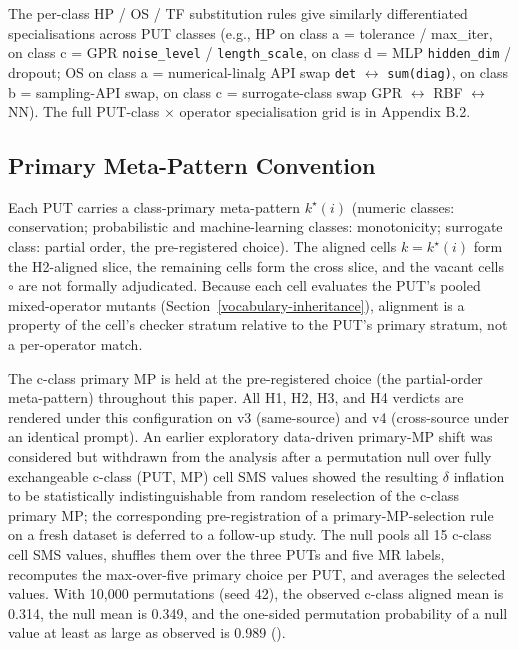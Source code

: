 \documentclass[manuscript,screen,review]{acmart}
\begin{document}
The per-class HP / OS / TF substitution rules give similarly
differentiated specialisations across PUT classes (e.g., HP on class a =
tolerance / max\_iter, on class c = GPR \texttt{noise\_level} /
\texttt{length\_scale}, on class d = MLP \texttt{hidden\_dim} / dropout;
OS on class a = numerical-linalg API swap \texttt{det} $\leftrightarrow$
\texttt{sum(diag)}, on class b = sampling-API swap, on class c =
surrogate-class swap GPR $\leftrightarrow$ RBF $\leftrightarrow$ NN). The full PUT-class $\times$ operator
specialisation grid is in Appendix B.2.

\subsection{Primary Meta-Pattern Convention}\label{primary-mp-convention}

Each PUT carries a class-primary meta-pattern $k^\star(i)$ (numeric
classes: conservation; probabilistic and machine-learning classes:
monotonicity; surrogate class: partial order, the pre-registered
choice). The aligned cells $k = k^\star(i)$ form the H2-aligned slice,
the remaining cells form the cross slice, and the vacant cells
\texttt{$\circ$} are not formally adjudicated. Because each cell
evaluates the PUT's pooled mixed-operator mutants
(Section~\ref{vocabulary-inheritance}), alignment is a property of the
cell's checker stratum relative to the PUT's primary stratum, not a
per-operator match.

The c-class primary MP is held at the pre-registered choice (the
partial-order meta-pattern)
throughout this paper. All H1, H2, H3, and H4 verdicts are rendered
under this configuration on v3 (same-source) and v4 (cross-source under
an identical prompt). An earlier exploratory data-driven primary-MP
shift was considered but withdrawn from the analysis after a permutation
null over fully exchangeable c-class (PUT, MP) cell SMS values showed
the resulting $\delta$ inflation to be statistically indistinguishable from
random reselection of the c-class primary MP; the corresponding
pre-registration of a primary-MP-selection rule on a fresh dataset is
deferred to a follow-up study. The null pools all 15 c-class cell SMS
values, shuffles them over the three PUTs and five MR labels, recomputes
the max-over-five primary choice per PUT, and averages the selected
values. With 10,000 permutations (seed 42), the observed c-class aligned
mean is 0.314, the null mean is 0.349, and the one-sided permutation
probability of a null value at least as large as observed is 0.989
().
\end{document}

